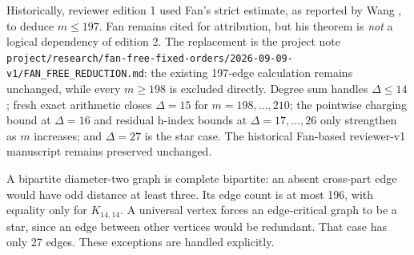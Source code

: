 \documentclass[11pt,a4paper]{article}
\begin{document}
Historically, reviewer edition 1 used Fan's strict estimate, as reported by Wang \cite[p.~2]{wang}, to deduce $m\le197$. Fan remains cited for attribution, but his theorem is \emph{not} a logical dependency of edition 2. The replacement is the project note \texttt{project/research/fan-free-fixed-orders/2026-09-09-v1/FAN\_FREE\_REDUCTION.md}: the existing 197-edge calculation remains unchanged, while every $m\ge198$ is excluded directly. Degree sum handles $\Delta\le14$; fresh exact arithmetic closes $\Delta=15$ for $m=198,\ldots,210$; the pointwise charging bound at $\Delta=16$ and residual h-index bounds at $\Delta=17,\ldots,26$ only strengthen as $m$ increases; and $\Delta=27$ is the star case. The historical Fan-based reviewer-v1 manuscript remains preserved unchanged.

A bipartite diameter-two graph is complete bipartite: an absent cross-part edge would have odd distance at least three. Its edge count is at most 196, with equality only for $K_{14,14}$. A universal vertex forces an edge-critical graph to be a star, since an edge between other vertices would be redundant. That case has only 27 edges. These exceptions are handled explicitly.
\end{document}
